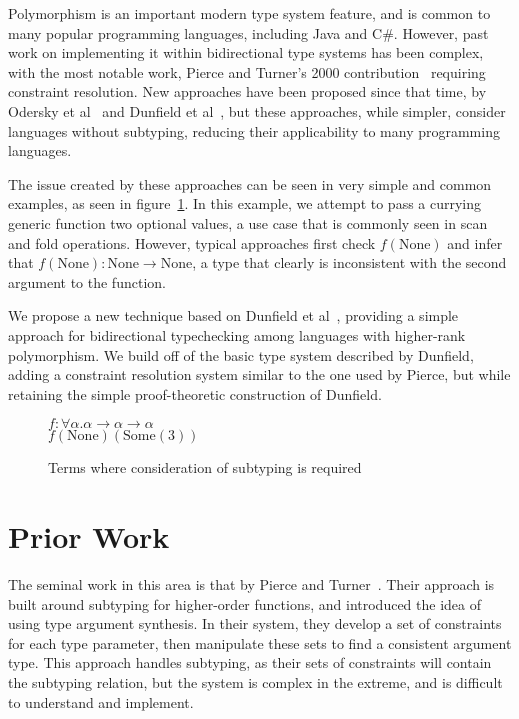 \documentclass{sig-alternate}
\newcommand{\typeexample}[2]{$#1$\\$#2$}
\begin{document}
Polymorphism is an important modern type system feature, and is common to many popular programming languages, including Java and C\#. However, past work on implementing it within bidirectional type systems has been complex, with the most notable work, Pierce and Turner's 2000 contribution~\cite{Pierce:2000:LTI:345099.345100} requiring constraint resolution. New approaches have been proposed since that time, by Odersky et al~\cite{odersky2001colored} and Dunfield et al~\cite{Dunfield:2013:CEB:2544174.2500582}, but these approaches, while simpler, consider languages without subtyping, reducing their applicability to many programming languages.

The issue created by these approaches can be seen in very simple and common examples, as seen in figure~\ref{fig:intro-examples}. In this example, we attempt to pass a currying generic function two optional values, a use case that is commonly seen in scan and fold operations. However, typical approaches first check $f(\text{None})$ and infer that $f(\text{None}) : \text{None} \rightarrow \text{None}$, a type that clearly is inconsistent with the second argument to the function.

We propose a new technique based on Dunfield et al~\cite{Dunfield:2013:CEB:2544174.2500582}, providing a simple approach for bidirectional typechecking among languages with higher-rank polymorphism. We build off of the basic type system described by Dunfield, adding a constraint resolution system similar to the one used by Pierce, but while retaining the simple proof-theoretic construction of Dunfield.
\begin{figure}
\centering
\label{fig:intro-examples}
\typeexample
{f : \forall \alpha.\alpha \rightarrow \alpha \rightarrow \alpha}
{f(\text{None})(\text{Some}(3))}
\caption{Terms where consideration of subtyping is required}
\end{figure}


\section{Prior Work}

The seminal work in this area is that by Pierce and Turner~\cite{Pierce:2000:LTI:345099.345100}. Their approach is built around subtyping for higher-order functions, and introduced the idea of using type argument synthesis. In their system, they develop a set of constraints for each type parameter, then manipulate these sets to find a consistent argument type. This approach handles subtyping, as their sets of constraints will contain the subtyping relation, but the system is complex in the extreme, and is difficult to understand and implement.
\end{document}
